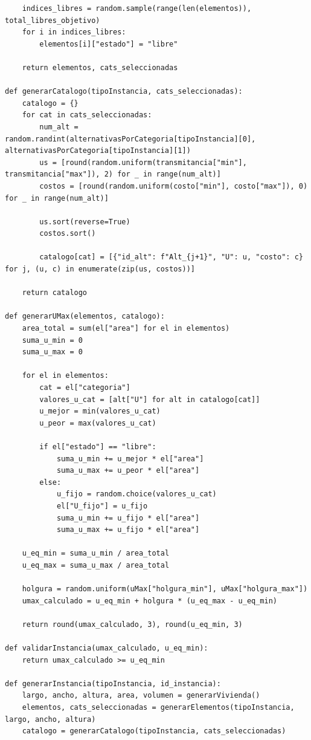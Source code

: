 \begin{lstlisting}
    indices_libres = random.sample(range(len(elementos)), total_libres_objetivo)
    for i in indices_libres:
        elementos[i]["estado"] = "libre"
        
    return elementos, cats_seleccionadas

def generarCatalogo(tipoInstancia, cats_seleccionadas):
    catalogo = {}
    for cat in cats_seleccionadas:
        num_alt = random.randint(alternativasPorCategoria[tipoInstancia][0], alternativasPorCategoria[tipoInstancia][1])
        us = [round(random.uniform(transmitancia["min"], transmitancia["max"]), 2) for _ in range(num_alt)]
        costos = [round(random.uniform(costo["min"], costo["max"]), 0) for _ in range(num_alt)]
        
        us.sort(reverse=True)
        costos.sort()
        
        catalogo[cat] = [{"id_alt": f"Alt_{j+1}", "U": u, "costo": c} for j, (u, c) in enumerate(zip(us, costos))]
        
    return catalogo

def generarUMax(elementos, catalogo):
    area_total = sum(el["area"] for el in elementos)
    suma_u_min = 0
    suma_u_max = 0
    
    for el in elementos:
        cat = el["categoria"]
        valores_u_cat = [alt["U"] for alt in catalogo[cat]]
        u_mejor = min(valores_u_cat)
        u_peor = max(valores_u_cat)
        
        if el["estado"] == "libre":
            suma_u_min += u_mejor * el["area"]
            suma_u_max += u_peor * el["area"]
        else:
            u_fijo = random.choice(valores_u_cat)
            el["U_fijo"] = u_fijo 
            suma_u_min += u_fijo * el["area"]
            suma_u_max += u_fijo * el["area"]
            
    u_eq_min = suma_u_min / area_total
    u_eq_max = suma_u_max / area_total
    
    holgura = random.uniform(uMax["holgura_min"], uMax["holgura_max"])
    umax_calculado = u_eq_min + holgura * (u_eq_max - u_eq_min)
    
    return round(umax_calculado, 3), round(u_eq_min, 3)

def validarInstancia(umax_calculado, u_eq_min):
    return umax_calculado >= u_eq_min

def generarInstancia(tipoInstancia, id_instancia):
    largo, ancho, altura, area, volumen = generarVivienda()
    elementos, cats_seleccionadas = generarElementos(tipoInstancia, largo, ancho, altura)
    catalogo = generarCatalogo(tipoInstancia, cats_seleccionadas)
    

\end{lstlisting}
